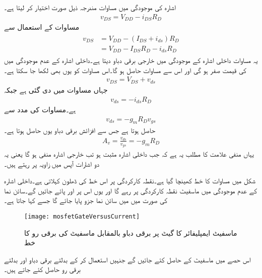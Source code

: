 اشارہ  کی موجودگی میں مساوات   مندرجہ ذیل صورت اختیار کر لیتا ہے۔
\begin{align}
v_{DS}=V_{DD}-i_{DS}R_D
\end{align}
مساوات   کے استعمال سے 
\begin{gather}
\begin{aligned}
v_{DS}&=V_{DD}-\left(I_{DS}+i_{ds} \right )R_D\\
&=V_{DD}-I_{DS}R_D-i_{ds}R_D
\end{aligned}
\end{gather}
یہ مساوات داخلی اشارہ کے موجودگی میں خارجی برقی دباو دیتا ہے۔داخلی اشارہ کے عدم موجودگی میں  کی قیمت صفر ہو گی اور اس سے مساوات  حاصل ہو گا۔اس مساوات کو یوں بھی لکھا جا سکتا ہے۔
\begin{align}
v_{DS}=V_{DS}+v_{ds}
\end{align}
جہاں   مساوات   میں دی گئی ہے جبکہ 
\begin{align}
v_{ds}=-i_{ds} R_D
\end{align}
ہے۔مساوات   کی مدد سے
\begin{align}
v_{ds}=-g_m R_D v_{gs}
\end{align}
حاصل ہوتا ہے جس سے افزائش برقی دباو یوں حاصل ہوتا ہے۔
\begin{align}\label{مساوات_ماسفیٹ_افزائش_کی_سادہ_مساوات}
A_v=\frac{v_{ds}}{v_{gs}}=-g_m R_D
\end{align}
یہاں منفی علامت کا مطلب یہ ہے کہ جب داخلی اشارہ   مثبت ہو تب خارجی اشارہ   منفی ہو گا یعنی یہ دو اشارات آپس میں   زاویہ پر رہتے ہیں۔

شکل  میں  مساوات  کا خط کھینچا گیا ہے۔نقطہ  کارکردگی پر اس خط کی ڈھلون  کہلاتی ہے۔داخلی اشارہ  کے عدم موجودگی میں ماسفیٹ نقطہ کارکردگی  پر رہے گا اور یوں اس پر  اور  پائے جائیں گے۔سائن نما  کی صورت میں  میں سائن نما جزو پایا جائے گا جسے  کہا جاتا ہے۔
\begin{figure}
\centering
\texttt{[image: mosfetGateVersusCurrent]}
\caption{ماسفیٹ ایمپلیفائر کا گیٹ پر برقی دباو بالمقابل ماسفیٹ کی برقی رو کا خط}
\label{شکل_ماسفیٹ_ایمپلیفائر_گیٹ_دباو_بالمقابل_برقی_رو}
\end{figure}
اس حصے میں ماسفیٹ کے  حاصل کئے جائیں گے جنہیں استعمال کر کے بدلتے برقی دباو اور بدلتے برقی رو حاصل کئے جاتے ہیں۔

